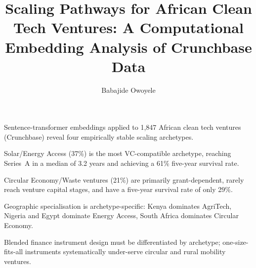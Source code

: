 \documentclass[review,12pt]{elsarticle}
\begin{document}
\begin{frontmatter}

\title{Scaling Pathways for African Clean Tech Ventures:
       A Computational Embedding Analysis of Crunchbase Data}

\author[rsm]{Babajide Owoyele}


\begin{highlights}
\item Sentence-transformer embeddings applied to 1,847 African clean
      tech ventures (Crunchbase) reveal four empirically stable
      scaling archetypes.
\item Solar/Energy Access (37\%) is the most VC-compatible archetype,
      reaching Series~A in a median of 3.2 years and achieving a
      61\% five-year survival rate.
\item Circular Economy/Waste ventures (21\%) are primarily
      grant-dependent, rarely reach venture capital stages, and have
      a five-year survival rate of only 29\%.
\item Geographic specialisation is archetype-specific: Kenya dominates
      AgriTech, Nigeria and Egypt dominate Energy Access, South Africa
      dominates Circular Economy.
\item Blended finance instrument design must be differentiated by
      archetype; one-size-fits-all instruments systematically
      under-serve circular and rural mobility ventures.
\end{highlights}


\end{frontmatter}
\end{document}
